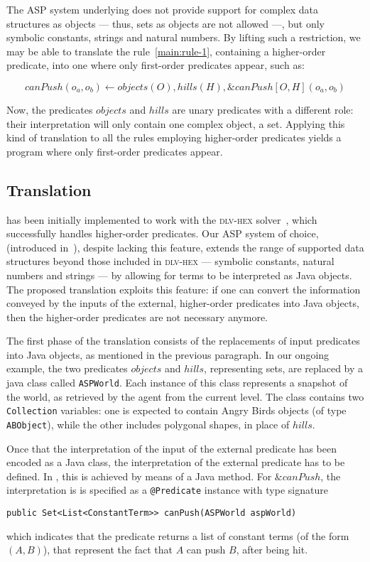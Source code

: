 The ASP system underlying \ah does not provide support for complex data structures as objects --- thus, sets as objects are not allowed ---, but only symbolic constants, strings and natural numbers.
By lifting such a restriction, we may be able to translate the rule~\eqref{main:rule-1}, containing a higher-order predicate, into one where only first-order predicates appear, such as:

$$ canPush(o_a,o_b) \leftarrow objects(O), hills(H), \&canPush[O,H](o_a,o_b) \label{main:rule-2} $$

Now, the predicates $objects$ and $hills$ are unary predicates with a different role: their interpretation will only contain one complex object, a set.
Applying this kind of translation to all the rules employing higher-order predicates yields a program where only first-order predicates appear.

\subsection{Translation}

\ah has been initially implemented to work with the \textsc{dlv-hex} solver~\cite{dlvHEX}, which successfully handles higher-order predicates.
Our ASP system of choice, \al (introduced in~\cite{blend}), despite lacking this feature, extends the range of supported data structures beyond those included in \textsc{dlv-hex} --- symbolic constants, natural numbers and strings --- by allowing for terms to be interpreted as Java objects.
The proposed translation exploits this feature: if one can convert the information conveyed by the inputs of the external, higher-order predicates into Java objects, then the higher-order predicates are not necessary anymore.

The first phase of the translation consists of the replacements of input predicates into Java objects, as mentioned in the previous paragraph.
In our ongoing example, the two predicates $objects$ and $hills$, representing sets, are replaced by a java class called \texttt{ASPWorld}.
Each instance of this class represents a snapshot of the world, as retrieved by the agent from the current level.
The class contains two \texttt{Collection} variables: one is expected to contain Angry Birds objects (of type \texttt{ABObject}), while the other includes polygonal shapes, in place of $hills$.

Once that the interpretation of the input of the external predicate has been encoded as a Java class, the interpretation of the external predicate has to be defined.
In \al, this is achieved by means of a Java method.
For $\&canPush$, the interpretation is  is specified as a \texttt{@Predicate} instance with type signature
\begin{center}
    \texttt{public Set<List<ConstantTerm>> canPush(ASPWorld aspWorld)}
\end{center}
which indicates that the predicate returns a list of constant terms (of the form \((A,B)\)), that represent the fact that \(A\) can push \(B\), after being hit.

